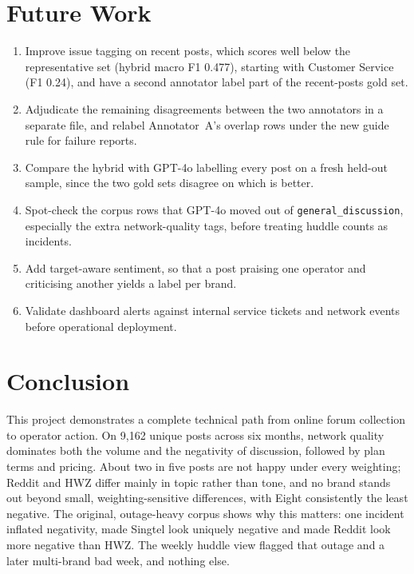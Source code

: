 \documentclass[11pt,a4paper]{article}
\begin{document}
\section{Future Work}

\begin{enumerate}
  \item Improve issue tagging on recent posts, which scores well below the representative set (hybrid macro F1 0.477), starting with Customer Service (F1 0.24), and have a second annotator label part of the recent-posts gold set.
  \item Adjudicate the remaining disagreements between the two annotators in a separate file, and relabel Annotator~A's overlap rows under the new guide rule for failure reports.
  \item Compare the hybrid with GPT-4o labelling every post on a fresh held-out sample, since the two gold sets disagree on which is better.
  \item Spot-check the corpus rows that GPT-4o moved out of \texttt{general\_discussion}, especially the extra network-quality tags, before treating huddle counts as incidents.
  \item Add target-aware sentiment, so that a post praising one operator and criticising another yields a label per brand.
  \item Validate dashboard alerts against internal service tickets and network events before operational deployment.
\end{enumerate}

\section{Conclusion}

This project demonstrates a complete technical path from online forum collection to operator action. On 9,162 unique posts across six months, network quality dominates both the volume and the negativity of discussion, followed by plan terms and pricing. About two in five posts are not happy under every weighting; Reddit and HWZ differ mainly in topic rather than tone, and no brand stands out beyond small, weighting-sensitive differences, with Eight consistently the least negative. The original, outage-heavy corpus shows why this matters: one incident inflated negativity, made Singtel look uniquely negative and made Reddit look more negative than HWZ. The weekly huddle view flagged that outage and a later multi-brand bad week, and nothing else.
\end{document}
